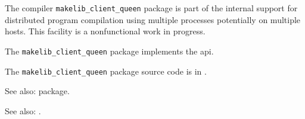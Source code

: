 
The compiler {\tt makelib\_client\_queen} package is part of the internal 
support for distributed program compilation using multiple processes 
potentially on multiple hosts.  This facility is a nonfunctional 
work in progress.

The {\tt makelib\_client\_queen} package implements the  api.

The {\tt makelib\_client\_queen} package source code is in .

See also:  package.

See also: .
